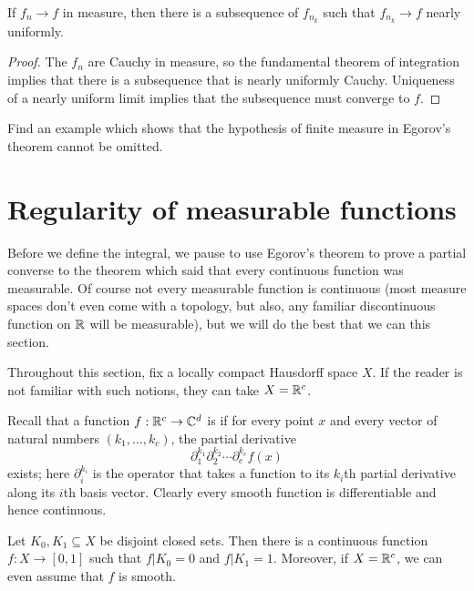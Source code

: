 \begin{corollary}
If $f_{n} \to f$ in measure, then there is a subsequence of $f_{n_{k}}$ such that $f_{n_{k}} \to f$ nearly uniformly.
\end{corollary}
\begin{proof}
The $f_{n}$ are Cauchy in measure, so the fundamental theorem of integration implies that there is a subsequence that is nearly uniformly Cauchy.
Uniqueness of a nearly uniform limit implies that the subsequence must converge to $f$.
\end{proof}

\begin{exercise}
Find an example which shows that the hypothesis of finite measure in Egorov's theorem cannot be omitted.
\end{exercise}

\section{Regularity of measurable functions}
Before we define the integral, we pause to use Egorov's theorem to prove a partial converse to the theorem which said that every continuous function was measurable.
Of course not every measurable function is continuous (most measure spaces don't even come with a topology, but also, any familiar discontinuous function on $\mathbb{R}$ will be measurable), but we will do the best that we can this section.

\begin{subsec}
Throughout this section, fix a locally compact Hausdorff space $X$. If the reader is not familiar with such notions, they can take $X = \mathbb{R}^c$.
\end{subsec}

\begin{subsec}
Recall that a function $f: \mathbb{R}^{c} \to \mathbb{C}^d$ is  if for every point $x$ and every vector of natural numbers $(k_1, \dots, k_{c})$, the partial derivative
\[\partial_1^{k_1} \partial_2^{k_2} \cdots \partial_{c}^{k_{c}} f(x)\]
exists; here $\partial_i^{k_i}$ is the operator that takes a function to its $k_i$th partial derivative along its $i$th basis vector.
Clearly every smooth function is differentiable and hence continuous.
\end{subsec}

\begin{lemma}[Urysohn]
Let $K_0,K_1 \subseteq X$ be disjoint closed sets. Then there is a continuous function $f: X \to [0, 1]$ such that $f|K_0 = 0$ and $f|K_1 = 1$.
Moreover, if $X = \mathbb{R}^c$, we can even assume that $f$ is smooth.
\end{lemma}

